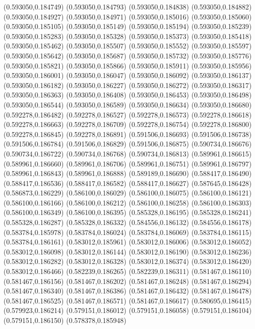 (0.593050,0.184749)
(0.593050,0.184793)
(0.593050,0.184838)
(0.593050,0.184882)
(0.593050,0.184927)
(0.593050,0.184971)
(0.593050,0.185016)
(0.593050,0.185060)
(0.593050,0.185105)
(0.593050,0.185149)
(0.593050,0.185194)
(0.593050,0.185239)
(0.593050,0.185283)
(0.593050,0.185328)
(0.593050,0.185373)
(0.593050,0.185418)
(0.593050,0.185462)
(0.593050,0.185507)
(0.593050,0.185552)
(0.593050,0.185597)
(0.593050,0.185642)
(0.593050,0.185687)
(0.593050,0.185732)
(0.593050,0.185776)
(0.593050,0.185821)
(0.593050,0.185866)
(0.593050,0.185911)
(0.593050,0.185956)
(0.593050,0.186001)
(0.593050,0.186047)
(0.593050,0.186092)
(0.593050,0.186137)
(0.593050,0.186182)
(0.593050,0.186227)
(0.593050,0.186272)
(0.593050,0.186317)
(0.593050,0.186363)
(0.593050,0.186408)
(0.593050,0.186453)
(0.593050,0.186498)
(0.593050,0.186544)
(0.593050,0.186589)
(0.593050,0.186634)
(0.593050,0.186680)
(0.592278,0.186482)
(0.592278,0.186527)
(0.592278,0.186573)
(0.592278,0.186618)
(0.592278,0.186663)
(0.592278,0.186709)
(0.592278,0.186754)
(0.592278,0.186800)
(0.592278,0.186845)
(0.592278,0.186891)
(0.591506,0.186693)
(0.591506,0.186738)
(0.591506,0.186784)
(0.591506,0.186829)
(0.591506,0.186875)
(0.590734,0.186676)
(0.590734,0.186722)
(0.590734,0.186768)
(0.590734,0.186813)
(0.589961,0.186615)
(0.589961,0.186660)
(0.589961,0.186706)
(0.589961,0.186751)
(0.589961,0.186797)
(0.589961,0.186843)
(0.589961,0.186888)
(0.589189,0.186690)
(0.588417,0.186490)
(0.588417,0.186536)
(0.588417,0.186582)
(0.588417,0.186627)
(0.587645,0.186428)
(0.586873,0.186229)
(0.586100,0.186029)
(0.586100,0.186075)
(0.586100,0.186121)
(0.586100,0.186166)
(0.586100,0.186212)
(0.586100,0.186258)
(0.586100,0.186303)
(0.586100,0.186349)
(0.586100,0.186395)
(0.585328,0.186195)
(0.585328,0.186241)
(0.585328,0.186287)
(0.585328,0.186332)
(0.584556,0.186132)
(0.584556,0.186178)
(0.583784,0.185978)
(0.583784,0.186024)
(0.583784,0.186069)
(0.583784,0.186115)
(0.583784,0.186161)
(0.583012,0.185961)
(0.583012,0.186006)
(0.583012,0.186052)
(0.583012,0.186098)
(0.583012,0.186144)
(0.583012,0.186190)
(0.583012,0.186236)
(0.583012,0.186282)
(0.583012,0.186328)
(0.583012,0.186374)
(0.583012,0.186420)
(0.583012,0.186466)
(0.582239,0.186265)
(0.582239,0.186311)
(0.581467,0.186110)
(0.581467,0.186156)
(0.581467,0.186202)
(0.581467,0.186248)
(0.581467,0.186294)
(0.581467,0.186340)
(0.581467,0.186386)
(0.581467,0.186432)
(0.581467,0.186478)
(0.581467,0.186525)
(0.581467,0.186571)
(0.581467,0.186617)
(0.580695,0.186415)
(0.579923,0.186214)
(0.579151,0.186012)
(0.579151,0.186058)
(0.579151,0.186104)
(0.579151,0.186150)
(0.578378,0.185948)

